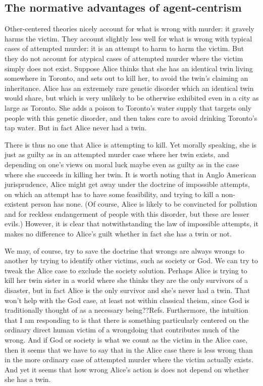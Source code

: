 \subsection{The normative advantages of agent-centrism}
Other-centered theories nicely account for what is wrong with murder: it gravely harms the victim. They account slightly less well 
for what is wrong with typical cases of attempted murder: it is an attempt to harm to harm the victim. But they do not account for
atypical cases of attempted murder where the victim simply does not exist. Suppose Alice thinks that she has an identical twin 
living somewhere in Toronto, and sets out to kill her, to avoid the twin's claiming an inheritance. Alice has an extremely rare
genetic disorder which an identical twin would share, but which is very unlikely to be otherwise exhibited even in a city as large as
Toronto. She adds a poison to Toronto's water supply that targets only people with this genetic disorder, and then takes care to avoid
drinking Toronto's tap water. But in fact Alice never had a twin. 

There is thus no one that Alice is attempting to kill. Yet morally speaking, she is just as guilty as in an attempted murder case 
where her twin exists, and depending on one's views on moral luck maybe even as guilty as in the case where she succeeds in killing 
her twin. It is worth noting that in Anglo American jurisprudence, Alice might get away under the doctrine of impossible attempts,
on which an attempt has to have some feasibility, and trying to kill a non-existent person has none. (Of course, Alice is likely to be
convincted for pollution and for reckless endangerment of people with this disorder, but these are lesser evils.) However, it is clear 
that notwithstanding the law of impossible attempts, it makes no difference to Alice's guilt whether in fact she has a twin or not.

We may, of course, try to save the doctrine that wrongs are always wrongs to another by trying to identify other victims, such as 
society or God. We can try to tweak the Alice case to exclude the society solution. Perhaps Alice is trying to kill her twin sister
in a world where she thinks they are the only survivors of a disaster, but in fact Alice is the only survivor and she's never had a
twin. That won't help with the God case, at least not within classical theism, since God is traditionally thought of as a necessary 
being??Refs. Furthermore, the intuition that I am responding to is that there is something particularly centered
on the ordinary direct human victim of a wrongdoing that contributes much of the wrong. And if God or society is what we count as 
the victim in the Alice case, then it seems that we have to say that in the Alice case there is less wrong than in the more ordinary
case of attempted murder where the victim actually exists. And yet it seems that how wrong Alice's action is does not depend on whether
she has a twin.

